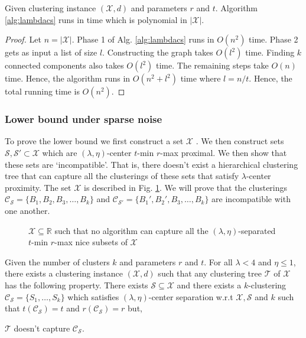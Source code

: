\documentclass[anon,12pt]{colt2016} %
\newcommand{\mc}{\mathcal}
\begin{document}
\begin{theorem}
Given clustering instance $(\mc X, d)$ and parameters $r$ and $t$. Algorithm \ref{alg:lambdacs} runs in time which is polynomial in $|\mc X|$.
\end{theorem}

\begin{proof}
Let $n = |\mc X|$. Phase 1 of Alg. \ref{alg:lambdacs} runs in $O(n^2)$ time. Phase 2 gets as input a list of size $l$. Constructing the graph takes $O(l^2)$ time. Finding $k$ connected components also takes $O(l^2)$ time. The remaining steps take $O(n)$ time. Hence, the algorithm runs in $O(n^2 + l^2)$ time where $l = n/t$. Hence, the total running time is $O(n^2)$.
\end{proof}



\subsubsection{Lower bound under sparse noise}
\label{section:lambdaLowerBoundSparse}

To prove the lower bound we first construct a set $\mc X$ . We then construct sets $\mc S, \mc S' \subset \mc X$ which are $(\lambda, \eta)$-center $t$-min $r$-max proximal. We then show that these sets are `incompatible'. That is, there doesn't exist a  hierarchical clustering tree that can capture all the clusterings of these sets that satisfy $\lambda$-center proximity. The set $\mc X$ is described in Fig. \ref{fig:noalglambdacs}. We will prove that the clusterings $\mc C_{\mc S} = \{B_1, B_2, B_3, \ldots, B_k\}$ and $\mc C_{\mc S'} = \{B_1', B_2', B_3, \ldots, B_k\}$ are incompatible with one another.

\begin{figure}

\caption{$\mc X \subseteq \mathbb{R}$ such that no algorithm can capture all the $(\lambda, \eta)$-separated $t$-min $r$-max nice subsets of $\mc X$}
\label{fig:noalglambdacs}
\end{figure}

\begin{theorem}
Given the number of clusters $k$ and parameters $r$ and $t$. For all $\lambda < 4$ and $\eta \le 1$, there exists a clustering instance $(\mc X , d)$ such that any clustering tree $\mc T$ of $\mc X$ has the following property. There exists $\mc S \subseteq \mc X$ and there exists a $k$-clustering $\mc C_{\mc S} = \{S_1, \ldots, S_k\}$ which satisfies $(\lambda, \eta)$-center separation w.r.t $\mc X, \mc S$ and $k$ such that $t(\mc C_{\mc S}) = t$ and $r(\mc C_{\mc S}) = r$ but,

$\mc T$ doesn't capture $\mc C_{\mc S}$.
\end{theorem}
\end{document}
